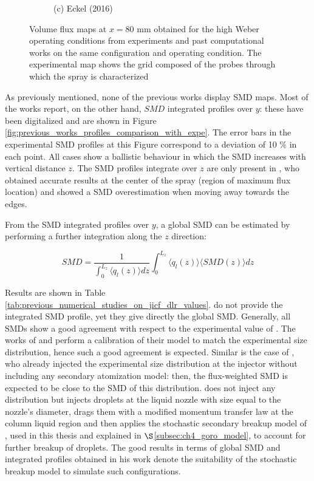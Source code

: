 \begin{figure}[h!]
\begin{subfigure}[b]{0.2\textwidth}
   \caption*{(c) Eckel (2016)}
\end{subfigure}
\caption{Volume flux maps at $x = 80$ mm obtained for the high Weber operating conditions from experiments  and past computational works on the same configuration and operating condition. The experimental map shows the grid composed of the probes through which the spray is characterized}
\label{fig:maps_previous_numerical_results}
\end{figure}

As previously mentioned, none of the previous works display SMD maps. Most of the works report, on the other hand, $SMD$ integrated profiles over $y$: these have been digitalized and are shown in Figure \ref{fig:previous_works_profiles_comparison_with_expe}.   The error bars in the experimental SMD profiles at this Figure correspond to a deviation of 10 $\%$ in each point. All cases show a ballistic behaviour in which the SMD increases with vertical distance $z$. The SMD profiles integrate over $z$ are only present in , who obtained accurate results at the center of the spray (region of maximum flux location) and showed a SMD overestimation when moving away towards the edges.

From the SMD integrated profiles over $y$, a global SMD can be estimated by performing a further integration along the $z$ direction:

\begin{equation}
 SMD =  \frac{1}{ \int_0^{L_z} \langle q_l \left( z \right) \rangle dz} \int_0^{L_z} \langle q_l \left( z \right) \rangle \langle SMD \left( z \right) \rangle dz
\end{equation}


Results are shown in Table \ref{tab:previous_numerical_studies_on_jicf_dlr_values}.   do not provide the integrated SMD profile, yet they give directly the global SMD. Generally, all SMDs show a good agreement with respect to the experimental value of . The works of  and  perform a calibration of their model to match the experimental size distribution, hence such a good agreement is expected. Similar is the case of , who already injected the experimental size distribution at the injector without including any secondary atomization model: then, the flux-weighted SMD is expected to be close to the SMD of this distribution.  does not inject any distribution but injects droplets at the liquid nozzle with size equal to the nozzle's diameter, drags them with a modified momentum transfer law at the column liquid region and then applies the stochastic secondary breakup model of , used in this thesis and explained in $\S$\ref{subsec:ch4_goro_model}, to account for further breakup of droplets. The good results in terms of global SMD and integrated profiles obtained in his work denote the suitability of the stochastic breakup model to simulate such configurations.



